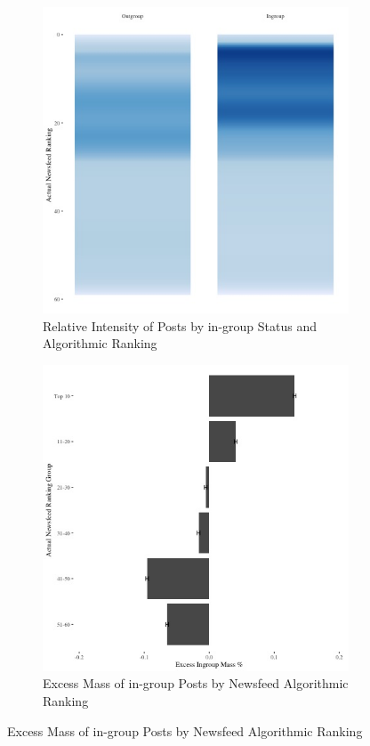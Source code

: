 \documentclass[12pt,letterpaper]{article}
\begin{document}
\begin{figure}[ht]
\caption{Relationship between Newsfeed Algorithmic Ranking and in-group Status of Posts}
\label{fig:nf_bygroup}
    \begin{subfigure}{.5\textwidth} 
        \centering
        \includegraphics[width=1\linewidth]{Output/Graphs/Audit/Heatmaps/US NF nf rank by ingroup - smooth.jpg}  
        \caption{Relative Intensity of Posts by in-group Status and Algorithmic Ranking}
        \label{fig:nf_bygroup_hm}
        \end{subfigure}
    \begin{subfigure}{.5\textwidth}
        \centering
        \includegraphics[width=.9\linewidth]{Output/Graphs/Audit/Excess Mass/US NF excess mass by ranking group.jpg}  
        \caption{Excess Mass of in-group Posts by Newsfeed Algorithmic Ranking}
        \label{fig:nf_bygroup_em}
    \end{subfigure}


\end{figure}
\end{document}
